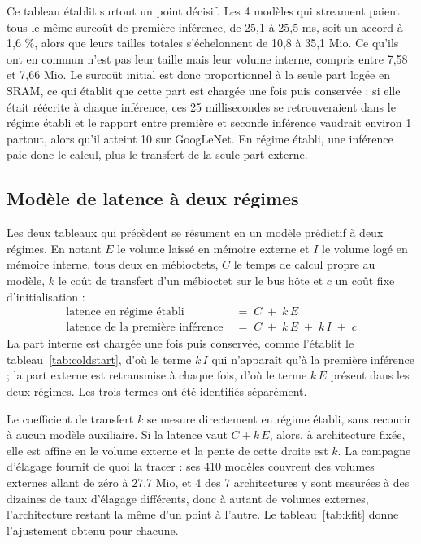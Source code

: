 \documentclass[11pt,a4paper]{report}
\begin{document}
Ce tableau établit surtout un point décisif. Les 4 modèles qui streament paient tous le même surcoût de première inférence, de 25,1 à 25,5 ms, soit un accord à 1,6 \%, alors que leurs tailles totales s'échelonnent de 10,8 à 35,1 Mio. Ce qu'ils ont en commun n'est pas leur taille mais leur volume interne, compris entre 7,58 et 7,66 Mio. Le surcoût initial est donc proportionnel à la seule part logée en SRAM, ce qui établit que cette part est chargée une fois puis conservée : si elle était réécrite à chaque inférence, ces 25 millisecondes se retrouveraient dans le régime établi et le rapport entre première et seconde inférence vaudrait environ 1 partout, alors qu'il atteint 10 sur GoogLeNet. En régime établi, une inférence paie donc le calcul, plus le transfert de la seule part externe.

\subsection{Modèle de latence à deux régimes}

Les deux tableaux qui précèdent se résument en un modèle prédictif à deux régimes. En notant $E$ le volume laissé en mémoire externe et $I$ le volume logé en mémoire interne, tous deux en mébioctets, $C$ le temps de calcul propre au modèle, $k$ le coût de transfert d'un mébioctet sur le bus hôte et $c$ un coût fixe d'initialisation :
%
\begin{align*}
\text{latence en régime établi} \;&=\; C \;+\; k\,E \\[2pt]
\text{latence de la première inférence} \;&=\; C \;+\; k\,E \;+\; k\,I \;+\; c
\end{align*}
%
La part interne est chargée une fois puis conservée, comme l'établit le tableau~\ref{tab:coldstart}, d'où le terme $k\,I$ qui n'apparaît qu'à la première inférence ; la part externe est retransmise à chaque fois, d'où le terme $k\,E$ présent dans les deux régimes. Les trois termes ont été identifiés séparément.

Le coefficient de transfert $k$ se mesure directement en régime établi, sans recourir à aucun modèle auxiliaire. Si la latence vaut $C + k\,E$, alors, à architecture fixée, elle est affine en le volume externe et la pente de cette droite est $k$. La campagne d'élagage fournit de quoi la tracer : ses 410 modèles couvrent des volumes externes allant de zéro à 27,7 Mio, et 4 des 7 architectures y sont mesurées à des dizaines de taux d'élagage différents, donc à autant de volumes externes, l'architecture restant la même d'un point à l'autre. Le tableau~\ref{tab:kfit} donne l'ajustement obtenu pour chacune.
\end{document}
